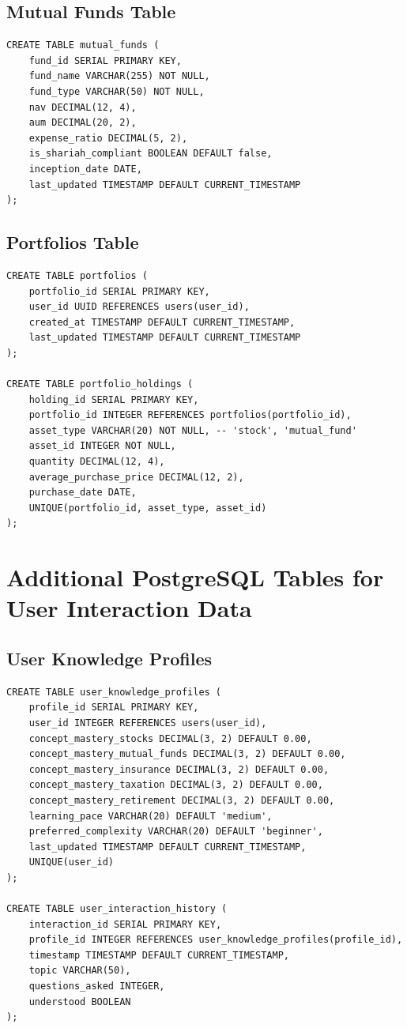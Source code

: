 \documentclass[12pt,a4paper]{report}
\begin{document}
\subsection{Mutual Funds Table}
\begin{lstlisting}
CREATE TABLE mutual_funds (
    fund_id SERIAL PRIMARY KEY,
    fund_name VARCHAR(255) NOT NULL,
    fund_type VARCHAR(50) NOT NULL,
    nav DECIMAL(12, 4),
    aum DECIMAL(20, 2),
    expense_ratio DECIMAL(5, 2),
    is_shariah_compliant BOOLEAN DEFAULT false,
    inception_date DATE,
    last_updated TIMESTAMP DEFAULT CURRENT_TIMESTAMP
);
\end{lstlisting}

\subsection{Portfolios Table}
\begin{lstlisting}
CREATE TABLE portfolios (
    portfolio_id SERIAL PRIMARY KEY,
    user_id UUID REFERENCES users(user_id),
    created_at TIMESTAMP DEFAULT CURRENT_TIMESTAMP,
    last_updated TIMESTAMP DEFAULT CURRENT_TIMESTAMP
);

CREATE TABLE portfolio_holdings (
    holding_id SERIAL PRIMARY KEY,
    portfolio_id INTEGER REFERENCES portfolios(portfolio_id),
    asset_type VARCHAR(20) NOT NULL, -- 'stock', 'mutual_fund'
    asset_id INTEGER NOT NULL,
    quantity DECIMAL(12, 4),
    average_purchase_price DECIMAL(12, 2),
    purchase_date DATE,
    UNIQUE(portfolio_id, asset_type, asset_id)
);
\end{lstlisting}

\section{Additional PostgreSQL Tables for User Interaction Data}

\subsection{User Knowledge Profiles}
\begin{lstlisting}
CREATE TABLE user_knowledge_profiles (
    profile_id SERIAL PRIMARY KEY,
    user_id INTEGER REFERENCES users(user_id),
    concept_mastery_stocks DECIMAL(3, 2) DEFAULT 0.00,
    concept_mastery_mutual_funds DECIMAL(3, 2) DEFAULT 0.00,
    concept_mastery_insurance DECIMAL(3, 2) DEFAULT 0.00,
    concept_mastery_taxation DECIMAL(3, 2) DEFAULT 0.00,
    concept_mastery_retirement DECIMAL(3, 2) DEFAULT 0.00,
    learning_pace VARCHAR(20) DEFAULT 'medium',
    preferred_complexity VARCHAR(20) DEFAULT 'beginner',
    last_updated TIMESTAMP DEFAULT CURRENT_TIMESTAMP,
    UNIQUE(user_id)
);

CREATE TABLE user_interaction_history (
    interaction_id SERIAL PRIMARY KEY,
    profile_id INTEGER REFERENCES user_knowledge_profiles(profile_id),
    timestamp TIMESTAMP DEFAULT CURRENT_TIMESTAMP,
    topic VARCHAR(50),
    questions_asked INTEGER,
    understood BOOLEAN
);
\end{lstlisting}
\end{document}
